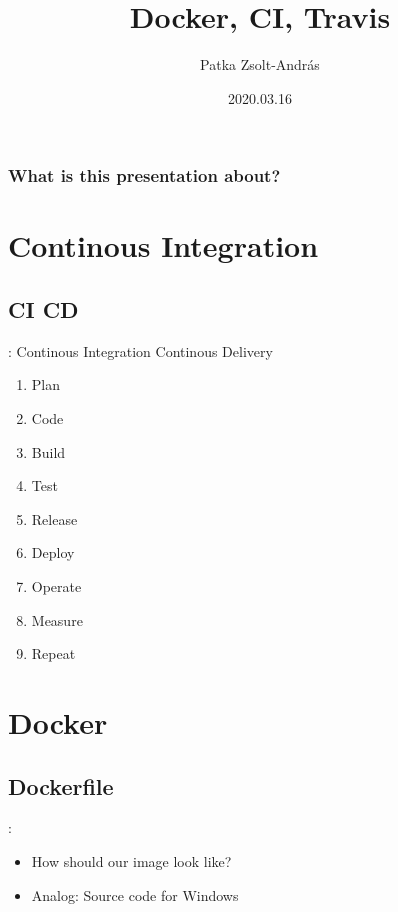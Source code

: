 \documentclass{beamer}
\title{Docker, CI, Travis}
\author{Patka Zsolt-András}
\institute{Sapientia - Computer Science BSc.}
\date{2020.03.16}
\begin{document}
\begin{frame}
    \titlepage
\end{frame}

\begin{frame}
\frametitle{What is this presentation about?}
\tableofcontents
\end{frame}

\section{Continous Integration}

\subsection{CI \/ CD}
\begin{frame}{\secname : \subsecname}
Continous Integration \/ Continous Delivery
    \begin{enumerate}
        \item Plan
        \item Code
        \item Build
        \item Test
        \item Release
        \item Deploy
        \item Operate
        \item Measure
        \item Repeat
    \end{enumerate}
\end{frame}


\section{Docker}

\subsection{Dockerfile}
\begin{frame}{\secname : \subsecname}

\begin{itemize}
    \item How should our image look like?
    \item Analog: Source code for Windows
\end{itemize}
\end{frame}

\end{document}
